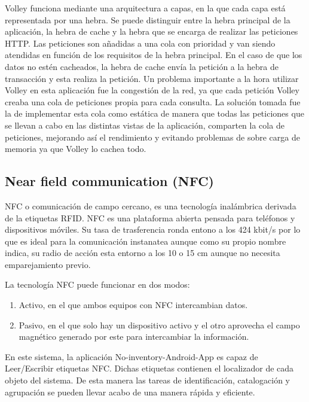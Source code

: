 \documentclass[a4paper,11pt]{book}
\begin{document}
Volley funciona mediante una arquitectura a capas, en la que cada capa está representada por una hebra. Se puede distinguir entre la hebra principal de la aplicación, la hebra de cache y la hebra que se encarga de realizar las peticiones HTTP.  Las peticiones son añadidas a una cola con prioridad y van siendo atendidas en función de los requisitos de la hebra principal. En el caso de que los datos no estén cacheados, la hebra de cache envía la petición a la hebra de transacción y esta realiza la petición. Un problema importante a la hora utilizar Volley en esta aplicación fue la congestión de la red, ya que cada petición Volley creaba una cola de peticiones propia para cada consulta. La solución tomada fue la de implementar esta cola como estática de manera que todas las peticiones que se llevan a cabo en las distintas vistas de la aplicación, comparten la cola de peticiones, mejorando así el rendimiento y evitando problemas de sobre carga de memoria ya que Volley lo cachea todo. 


\subsection{Near field communication (NFC)}
NFC\cite{nfc} o comunicación de campo cercano, es una tecnología inalámbrica derivada de la etiquetas RFID. NFC es una plataforma abierta pensada para teléfonos  y dispositivos móviles. Su tasa de trasferencia ronda entono a los  424 kbit/s por lo que es ideal para la comunicación instanatea aunque como su propio nombre indica, su radio de acción esta entorno a los 10 o 15 cm aunque no necesita emparejamiento previo. 

La tecnología NFC puede funcionar en dos modos:

\begin{enumerate}
\item Activo, en el que ambos equipos con NFC intercambian datos. 
\item Pasivo, en el que solo hay un dispositivo activo y el otro aprovecha el campo magnético generado por este para intercambiar la información.
\end{enumerate}

En este sistema, la aplicación No-inventory-Android-App es capaz de Leer/Escribir etiquetas NFC. Dichas etiquetas contienen el localizador de cada objeto del sistema. De esta manera las tareas de identificación, catalogación y agrupación  se pueden llevar acabo de una manera rápida y eficiente.
\end{document}
